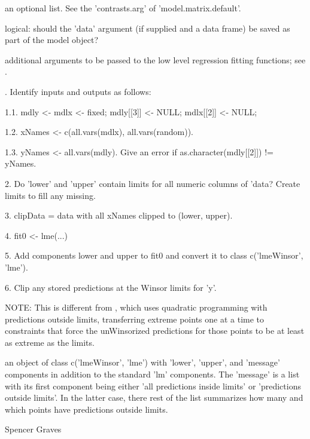 \begin{Arguments}
\begin{ldescription}
\item[\code{ contrasts }] an optional list. See the 'contrasts.arg' of
'model.matrix.default'. 

\item[\code{keep.data}] logical: should the 'data' argument (if supplied and a data frame)
be saved as part of the model object? 

\item[\code{...}] additional arguments to be passed to the low level regression
fitting functions;  see . 

\end{ldescription}
\end{Arguments}
\begin{Details}.  Identify inputs and outputs as follows:

1.1.  mdly <- mdlx <- fixed;  mdly[[3]] <- NULL;  mdlx[[2]] <- NULL;

1.2.  xNames <- c(all.vars(mdlx), all.vars(random)).

1.3.  yNames <- all.vars(mdly).  Give an error if
as.character(mdly[[2]]) != yNames. 

2.  Do 'lower' and 'upper' contain limits for all numeric columns of
'data?  Create limits to fill any missing.   

3.  clipData = data with all xNames clipped to (lower, upper).

4.  fit0 <- lme(...)

5.  Add components lower and upper to fit0 and convert it to class
c('lmeWinsor', 'lme').  

6.  Clip any stored predictions at the Winsor limits for 'y'.  

NOTE:  This is different from , which uses quadratic 
programming with predictions outside limits, transferring extreme
points one at a time to constraints that force the unWinsorized
predictions for those points to be at least as extreme as the limits.
\end{Details}
\begin{Value}
an object of class c('lmeWinsor', 'lme') with 'lower', 'upper', and
'message' components in addition to the standard 'lm' components.  The
'message' is a list with its first component being either 'all
predictions inside limits' or 'predictions outside limits'.  In the
latter case, there rest of the list summarizes how many and which
points have predictions outside limits.
\end{Value}
\begin{Author}\relax
Spencer Graves
\end{Author}
